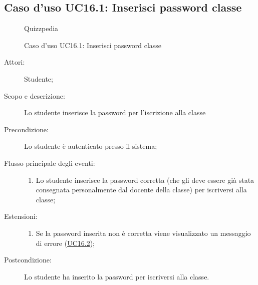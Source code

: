 \subsection{Caso d'uso UC16.1: Inserisci password classe}
        \begin{figure}[H]
            \centering
            \begin{resizedtikzpicture}{\textwidth}
		\begin{umlsystem}[x=0, fill=lightgray!20]{Quizzpedia}
		\end{umlsystem}
            \end{resizedtikzpicture}
            \caption{Caso d'uso UC16.1: Inserisci password classe}
            \label{fig:UC16.1} 
        \end{figure}
    \begin{description}
\item[Attori:] Studente;
\item[Scopo e descrizione:] Lo studente inserisce la password per l'iscrizione alla classe
      \item[Precondizione:] Lo studente è autenticato presso il sistema;

        \item[Flusso principale degli eventi:] \begin{enumerate}
          \item Lo studente inserisce la password corretta (che gli deve essere già stata consegnata personalmente dal docente della classe) per iscriversi alla classe;

      \end{enumerate}
    \item[Estensioni:]
      \begin{enumerate}
          \item Se la password inserita non è corretta viene visualizzato un messaggio di errore (\hyperlink{UC16.2}{UC16.2});

      \end{enumerate}
    \item[Postcondizione:] Lo studente ha inserito la password per iscriversi alla classe.
  \end{description}
\hypertarget{UC16.2}{}
